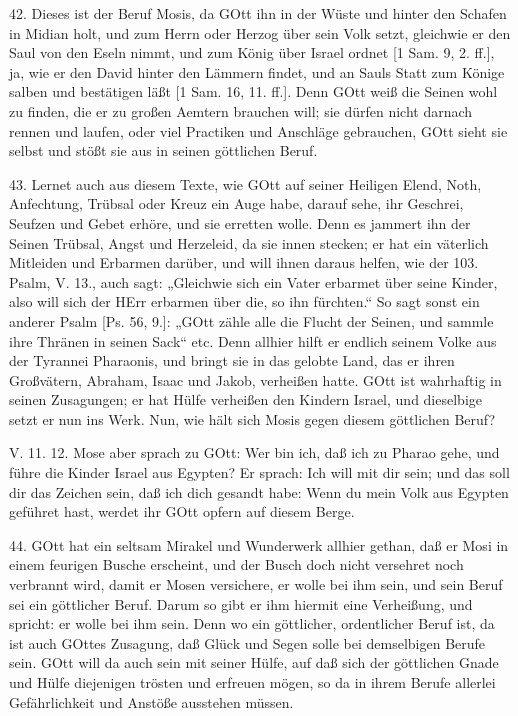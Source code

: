 42. Dieses ist der Beruf Mosis, da GOtt ihn in der Wüste und hinter den Schafen in Midian holt, und zum Herrn oder Herzog über sein Volk setzt, gleichwie er den Saul von den Eseln nimmt, und zum König über Israel ordnet [1 Sam. 9, 2. ff.], ja, wie er den David hinter den Lämmern findet, und an Sauls Statt zum Könige salben und bestätigen läßt [1 Sam. 16, 11. ff.]. Denn GOtt weiß die Seinen wohl zu finden, die er zu großen Aemtern brauchen will; sie dürfen nicht darnach rennen und laufen, oder viel Practiken und Anschläge gebrauchen, GOtt sieht sie selbst und stößt sie aus in seinen göttlichen Beruf.

43. Lernet auch aus diesem Texte, wie GOtt auf seiner Heiligen Elend, Noth, Anfechtung, Trübsal oder Kreuz ein Auge habe, darauf sehe, ihr Geschrei, Seufzen und Gebet erhöre, und sie erretten wolle. Denn es jammert ihn der Seinen Trübsal, Angst und Herzeleid, da sie innen stecken; er hat ein väterlich Mitleiden und Erbarmen darüber, und will ihnen daraus helfen, wie der 103. Psalm, V. 13., auch sagt: „Gleichwie sich ein Vater erbarmet über seine Kinder, also will sich der HErr erbarmen über die, so ihn fürchten.“ So sagt sonst ein anderer Psalm [Ps. 56, 9.]: „GOtt zähle alle die Flucht der Seinen, und sammle ihre Thränen in seinen Sack“ etc. Denn allhier hilft er endlich seinem Volke aus der Tyrannei Pharaonis, und bringt sie in das gelobte Land, das er ihren Großvätern, Abraham, Isaac und Jakob, verheißen hatte. GOtt ist wahrhaftig in seinen Zusagungen; er hat Hülfe verheißen den Kindern Israel, und dieselbige setzt er nun ins Werk. Nun, wie hält sich Mosis gegen diesem göttlichen Beruf?

\begin{schriftzitat}
V. 11. 12. Mose aber sprach zu GOtt: Wer bin ich, daß ich zu Pharao gehe, und führe die Kinder Israel aus Egypten? Er sprach: Ich will mit dir sein; und das soll dir das Zeichen sein, daß ich dich gesandt habe: Wenn du mein Volk aus Egypten geführet hast, werdet ihr GOtt opfern auf diesem Berge.
\end{schriftzitat}

44. GOtt hat ein seltsam Mirakel und Wunderwerk allhier gethan, daß er Mosi in einem feurigen Busche erscheint, und der Busch doch nicht versehret noch verbrannt wird, damit er Mosen versichere, er wolle bei ihm sein, und sein Beruf sei ein göttlicher Beruf. Darum so gibt er ihm hiermit eine Verheißung, und spricht: er wolle bei ihm sein. Denn wo ein göttlicher, ordentlicher Beruf ist, da ist auch GOttes Zusagung, daß Glück und Segen solle bei demselbigen Berufe sein. GOtt will da auch sein mit seiner Hülfe, auf daß sich der göttlichen Gnade und Hülfe diejenigen trösten und erfreuen mögen, so da in ihrem Berufe allerlei Gefährlichkeit und Anstöße ausstehen müssen.

